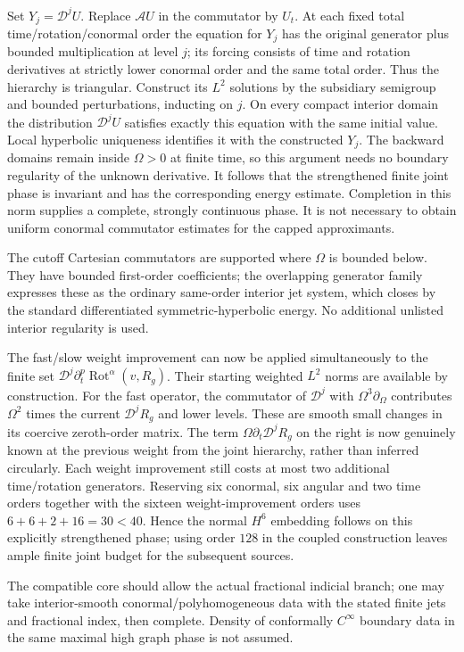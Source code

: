 Set $Y_j=\mathcal D^jU$.  Replace $\mathcal AU$ in the commutator by $U_t$.
At each fixed total time/rotation/conormal order the equation for $Y_j$
has the original generator plus bounded multiplication at level $j$;
its forcing consists of time and rotation derivatives at strictly lower
conormal order and the same total order.  Thus the hierarchy is triangular.
Construct its $L^2$ solutions by the subsidiary semigroup and bounded
perturbations, inducting on $j$.  On every compact interior domain the
distribution $\mathcal D^jU$ satisfies exactly this equation with the same
initial value.  Local hyperbolic uniqueness identifies it with the
constructed $Y_j$.  The backward domains remain inside $\Omega>0$ at finite
time, so this argument needs no boundary regularity of the unknown derivative.
It follows that the strengthened finite joint phase is invariant and has
the corresponding energy estimate.  Completion in this norm supplies a
complete, strongly continuous phase.  It is not necessary to obtain uniform
conormal commutator estimates for the capped approximants.

The cutoff Cartesian commutators are supported where $\Omega$ is bounded
below.  They have bounded first-order coefficients; the overlapping
generator family expresses these as the ordinary same-order interior jet
system, which closes by the standard differentiated symmetric-hyperbolic
energy.  No additional unlisted interior regularity is used.

The fast/slow weight improvement can now be applied simultaneously to the
finite set $\mathcal D^j\partial_t^p\operatorname{Rot}^\alpha(v,R_g)$.
Their starting weighted $L^2$ norms are available by construction.  For the
fast operator, the commutator of $\mathcal D^j$ with
$\Omega^3\partial_\Omega$ contributes $\Omega^2$ times the current
$\mathcal D^jR_g$ and lower levels.  These are smooth small changes in its
coercive zeroth-order matrix.  The term
$\Omega\partial_t\mathcal D^jR_g$ on the right is now genuinely known at
the previous weight from the joint hierarchy, rather than inferred
circularly.  Each weight improvement still costs at most two additional
time/rotation generators.  Reserving six conormal, six angular and two
time orders together with the sixteen weight-improvement orders uses
$6+6+2+16=30<40$.  Hence the normal $H^6$ embedding follows on this
explicitly strengthened phase; using order $128$ in the coupled construction
leaves ample finite joint budget for the subsequent sources.

The compatible core should allow the actual fractional indicial branch;
one may take interior-smooth conormal/polyhomogeneous data with the stated
finite jets and fractional index, then complete.  Density of conformally
$C^\infty$ boundary data in the same maximal high graph phase is not assumed.
